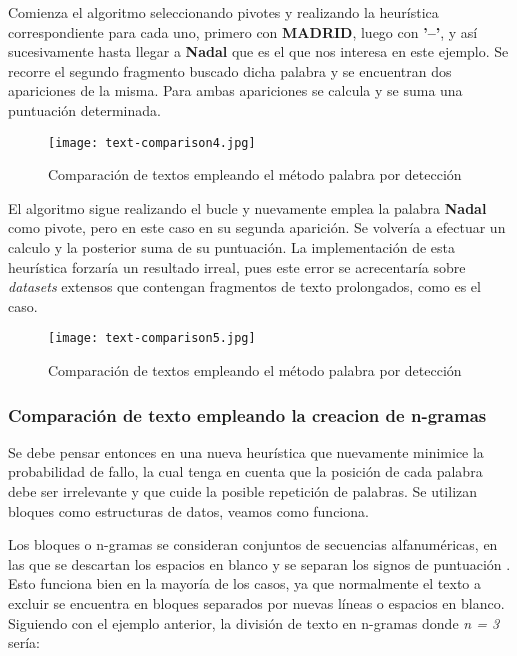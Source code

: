 Comienza el algoritmo seleccionando pivotes y realizando la heurística correspondiente para cada uno, 
primero con \textbf{MADRID}, luego con \textbf{'--'}, y así sucesivamente hasta llegar a \textbf{Nadal} 
que es el que nos interesa en este ejemplo. Se recorre el segundo fragmento buscado dicha palabra y se 
encuentran dos apariciones de la misma. Para ambas apariciones se calcula y se suma una puntuación 
determinada.

\begin{figure}[tphb]
  \centering
  \texttt{[image: text-comparison4.jpg]}
  \caption{Comparación de textos empleando el método palabra por detección}
  \label{img:comparacion de textos empleando el metodo palabra por deteccion p2}
\end{figure}

El algoritmo sigue realizando el bucle y nuevamente emplea la palabra \textbf{Nadal} como pivote, pero en
este caso en su segunda aparición. Se volvería a efectuar un calculo y la posterior suma de su puntuación.
La implementación de esta heurística forzaría un resultado irreal, pues este error se acrecentaría sobre
\emph{datasets} extensos que contengan fragmentos de texto prolongados, como es el caso.

\begin{figure}[tphb]
  \centering
  \texttt{[image: text-comparison5.jpg]}
  \caption{Comparación de textos empleando el método palabra por detección}
  \label{img:comparacion de textos empleando el metodo palabra por deteccion p3}
\end{figure}

\subsubsection{Comparación de texto empleando la creacion de n-gramas}
\label{subsubsec:comparacion de textos empleando la creacion de n-gramas}

Se debe pensar entonces en una nueva heurística que nuevamente minimice la probabilidad de fallo, la cual
tenga en cuenta que la posición de cada palabra debe ser irrelevante y que cuide la posible repetición de
palabras. Se utilizan bloques como estructuras de datos, veamos como funciona.

Los bloques o n-gramas se consideran conjuntos de secuencias alfanuméricas, en las que se descartan los
espacios en blanco y se separan los signos de puntuación \cite{ngrams-thesis}. Esto funciona bien en la 
mayoría de los casos, ya que normalmente el texto a excluir se encuentra en bloques separados por nuevas 
líneas o espacios en blanco. Siguiendo con el ejemplo anterior, la división de texto en n-gramas donde 
\emph{n = 3} sería:

